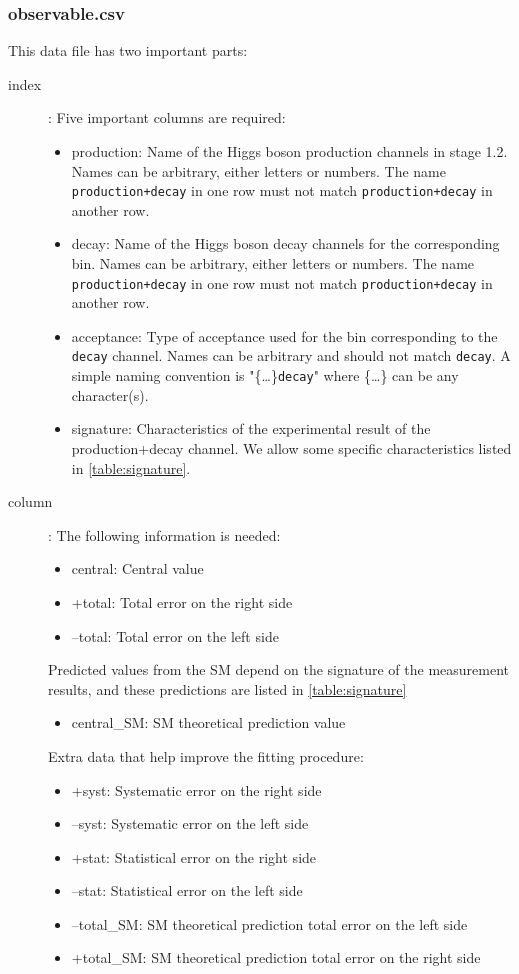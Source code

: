 \documentclass[12pt]{article}
\begin{document}
 \subsubsection{observable.csv}
 This data file has two important parts:
 \begin{description}
   \item[{\color{red}index}]: Five important columns are required:
   \begin{itemize}
   \item production: Name of the Higgs boson production channels in stage 1.2. Names can be arbitrary, either letters or numbers. The name \verb|production+decay| in one row must not match \verb|production+decay| in another row.
   \item decay: Name of the Higgs boson decay channels for the corresponding bin. Names can be arbitrary, either letters or numbers. The name \verb|production+decay| in one row must not match \verb|production+decay| in another row.
   \item acceptance: Type of acceptance used for the bin corresponding to the \verb|decay| channel. Names can be arbitrary and should not match \verb|decay|. A simple naming convention is "\{\dots\}\verb|decay|" where \{\dots\} can be any character(s).
   \item signature: Characteristics of the experimental result of the production+decay channel. We allow some specific characteristics listed in \ref{table:signature}.
  \end{itemize}
  \item[{\color{blue} column}]: The following information is needed:
   \begin{itemize}
         \item central: Central value
         \item +total: Total error on the right side
         \item --total: Total error on the left side
   \end{itemize}
   Predicted values from the SM depend on the signature of the measurement results, and these predictions are listed in \ref{table:signature} 
   \begin{itemize}
         \item central\_SM: SM theoretical prediction value
        \end{itemize}
    Extra data that help improve the fitting procedure:
        \begin{itemize}
          \item +syst: Systematic error on the right side
          \item --syst: Systematic error on the left side
          \item +stat: Statistical error on the right side
          \item --stat: Statistical error on the left side
          \item --total\_SM: SM theoretical prediction total error on the left side
          \item +total\_SM:  SM theoretical prediction total error on the right side
   \end{itemize}
  \end{description}
 
\end{document}
